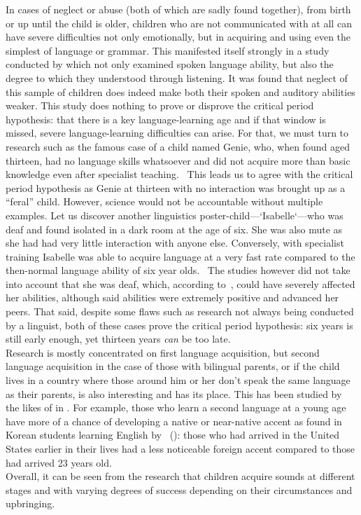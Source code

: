 \documentclass[12pt]{article}
\begin{document}
In cases of neglect or abuse (both of which are sadly found together),
from birth or up until the child is older, children who are not
communicated with at all can have severe difficulties not only
emotionally, but in acquiring and using even the simplest of language
or grammar. This manifested itself strongly in a
\citeyear{effects-neglect-language} study conducted by
\citeauthor{effects-neglect-language} which not only examined spoken
language ability, but also the degree to which they understood through
listening. It was found that neglect of this sample of children does
indeed make both their spoken and auditory abilities weaker. This
study does nothing to prove or disprove the critical period
hypothesis: that there is a key language-learning age and if that
window is missed, severe language-learning difficulties can arise. For
that, we must turn to research such as the famous case of a child
named Genie, who, when found aged thirteen, had no language skills
whatsoever and did not acquire more than basic knowledge even after
specialist teaching.~\cite{genie} This leads us to agree with the
critical period hypothesis as Genie at thirteen with no interaction
was brought up as a ``feral'' child. However, science would not be
accountable without multiple examples. Let us discover another
linguistics poster-child---`Isabelle`---who was deaf and found
isolated in a dark room at the age of six. She was also mute as she
had had very little interaction with anyone else.  Conversely, with
specialist training Isabelle was able to acquire language at a very
fast rate compared to the then-normal language ability of six year
olds.~\cite{isabelle} The studies however did not take into account
that she was deaf, which, according to~\citeauthor{isabelle-deaf},
could have severely affected her abilities, although said abilities
were extremely positive and advanced her peers. That said, despite
some flaws such as research not always being conducted by a linguist,
both of these cases prove the critical period hypothesis: six years is
still early enough, yet thirteen years \textit{can} be too late.\\

Research is mostly concentrated on first language acquisition, but
second language acquisition in the case of those with bilingual
parents, or if the child lives in a country where those around him or
her don't speak the same language as their parents, is also
interesting and has its place. This has been studied by the likes of
\citeauthor{important-second-language-acquisition} in
\citeyear{important-second-language-acquisition}. For example, those
who learn a second language at a young age have more of a chance of
developing a native or near-native accent as found in Korean students
learning English by \citeauthor{accent}~(\citeyear{accent}): those who
had arrived in the United States earlier in their lives had a less
noticeable foreign accent compared to those had arrived 23 years
old.\\

Overall, it can be seen from the research that children acquire sounds
at different stages and with varying degrees of success depending on
their circumstances and upbringing.



\end{document}
